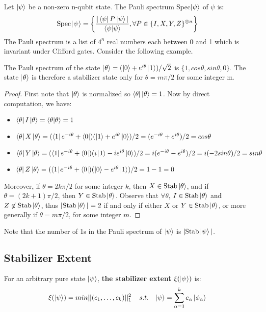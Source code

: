 \documentclass[12pt]{dalthesis}
\begin{document}
\begin{definition}
Let $\ket{\psi}$ be a non-zero n-qubit state. The Pauli spectrum Spec$\ket{\psi}$ of $\psi$ is:
\begin{equation}
\text{Spec}\ket{\psi} = \left\{ \frac{|\bra{\psi}P\ket{\psi}|}{\braket{\psi|\psi}}, \forall P \in \{I, X, Y, Z\}^{\otimes n} \right\}
\end{equation}
The Pauli spectrum is a list of $4^n$ real numbers each between 0 and 1 which is invariant under Clifford gates. Consider the following example.
\end{definition}

\begin{proposition}
The Pauli spectrum of the state $\ket{\theta} = (\ket{0} + e^{i\theta}\ket{1})/\sqrt{2}$ is $\{1, cos\theta, sin\theta, 0\}$. The state $\ket{\theta}$ is therefore a stabilizer state only for $\theta = m \pi/2$ for some integer m.
\end{proposition}
\begin{proof}
First note that $\ket{\theta}$ is normalized so $\bra{\theta}\ket{\theta} = 1$. Now by direct computation, we have:
\begin{itemize}
\item $\bra{\theta}I\ket{\theta} = \braket{\theta|\theta} = 1$
\item $\bra{\theta}X\ket{\theta} = (\bra{1}e^{-i\theta} + \bra{0})(\ket{1} + e^{i\theta}\ket{0})/2 = (e^{-i\theta} + e^{i\theta})/2 = cos\theta$
\item $\bra{\theta}Y\ket{\theta} = (\bra{1}e^{-i\theta} + \bra{0})(i\ket{1} - ie^{i\theta}\ket{0})/2 = i(e^{-i\theta} - e^{i\theta})/2 = i(-2sin\theta)/2 = sin\theta$
\item $\bra{\theta}Z\ket{\theta} = (\bra{1}e^{-i\theta} + \bra{0})(\ket{0} - e^{i\theta}\ket{1})/2 = 1 - 1 = 0$
\end{itemize} 
Moreover, if $\theta = 2k\pi /2$ for some integer $k$, then $X \in \text{Stab}\ket{\theta}$, and if $\theta = (2k+1)\pi /2$, then $Y \in \text{Stab}\ket{\theta}$. Observe that $\forall \theta$, $I \in \text{Stab}\ket{\theta}$ and $Z \not\in \text{Stab}\ket{\theta}$, thus $|\text{Stab}\ket{\theta}| = 2$ if and only if either $X$ or $Y \in \text{Stab}\ket{\theta}$, or more generally if $\theta = m \pi /2$, for some integer $m$.
\end{proof}
Note that the number of 1s in the Pauli spectrum of $\ket{\psi}$ is $|\text{Stab}\ket{\psi}|$.

\subsection{Stabilizer Extent}
\begin{definition}
For an arbitrary pure state $\ket{\psi}$, \textbf{the stabilizer extent} $\xi (\ket{\psi})$ is:
\begin{equation}
\xi (\ket{\psi}) = min||(c_1, \dots , c_k)||_1^2 \hspace{4mm} s.t. \hspace{3mm} \ket{\psi} = \sum_{\alpha = 1}^k c_{\alpha} \ket{\phi_{\alpha}}
\end{equation}
\end{definition}
\end{document}
